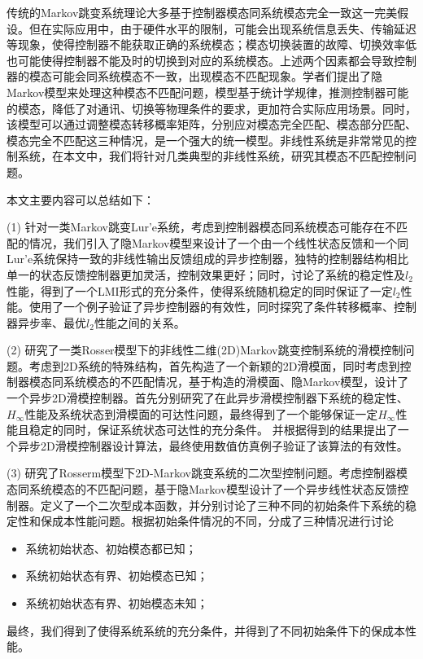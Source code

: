 
\begin{cabstract}
	传统的Markov跳变系统理论大多基于控制器模态同系统模态完全一致这一完美假设。但在实际应用中，由于硬件水平的限制，可能会出现系统信息丢失、传输延迟等现象，使得控制器不能获取正确的系统模态；模态切换装置的故障、切换效率低也可能使得控制器不能及时的切换到对应的系统模态。上述两个因素都会导致控制器的模态可能会同系统模态不一致，出现模态不匹配现象。学者们提出了隐Markov模型来处理这种模态不匹配问题，模型基于统计学规律，推测控制器可能的模态，降低了对通讯、切换等物理条件的要求，更加符合实际应用场景。同时，该模型可以通过调整模态转移概率矩阵，分别应对模态完全匹配、模态部分匹配、模态完全不匹配这三种情况，是一个强大的统一模型。非线性系统是非常常见的控制系统，在本文中，我们将针对几类典型的非线性系统，研究其模态不匹配控制问题。
	
	本文主要内容可以总结如下：
	
	(1) 针对一类Markov跳变Lur'e系统，考虑到控制器模态同系统模态可能存在不匹配的情况，我们引入了隐Markov模型来设计了一个由一个线性状态反馈和一个同Lur'e系统保持一致的非线性输出反馈组成的异步控制器，独特的控制器结构相比单一的状态反馈控制器更加灵活，控制效果更好；同时，讨论了系统的稳定性及$l_2$性能，得到了一个LMI形式的充分条件，使得系统随机稳定的同时保证了一定$l_2$性能。使用了一个例子验证了异步控制器的有效性，同时探究了条件转移概率、控制器异步率、最优$l_2$性能之间的关系。
	
	(2) 研究了一类Rosser模型下的非线性二维(2D)Markov跳变控制系统的滑模控制问题。考虑到2D系统的特殊结构，首先构造了一个新颖的2D滑模面，同时考虑到控制器模态同系统模态的不匹配情况，基于构造的滑模面、隐Markov模型，设计了一个异步2D滑模控制器。首先分别研究了在此异步滑模控制器下系统的稳定性、$H_\infty$性能及系统状态到滑模面的可达性问题，最终得到了一个能够保证一定$H_\infty$性能且稳定的同时，保证系统状态可达性的充分条件。 并根据得到的结果提出了一个异步2D滑模控制器设计算法，最终使用数值仿真例子验证了该算法的有效性。
	
	(3) 研究了Rosserm模型下2D-Markov跳变系统的二次型控制问题。考虑控制器模态同系统模态的不匹配问题，基于隐Markov模型设计了一个异步线性状态反馈控制器。定义了一个二次型成本函数，并分别讨论了三种不同的初始条件下系统的稳定性和保成本性能问题。根据初始条件情况的不同，分成了三种情况进行讨论
		\begin{itemize}
			\item 系统初始状态、初始模态都已知；
			\item 系统初始状态有界、初始模态已知；
			\item 系统初始状态有界、初始模态未知；
		\end{itemize}
	最终，我们得到了使得系统系统的充分条件，并得到了不同初始条件下的保成本性能。
	

  
\end{cabstract}

